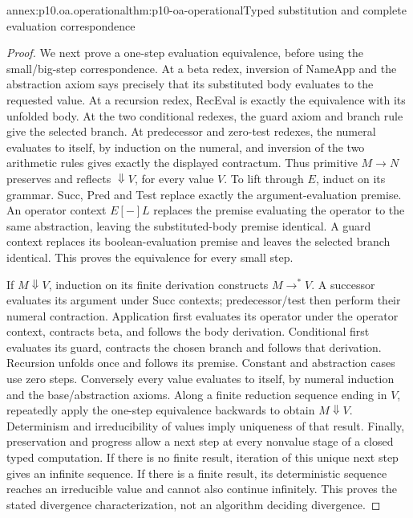 \begin{annexitem}{annex:p10.oa.operational}{thm:p10-oa-operational}{Typed substitution and complete evaluation correspondence}
\begin{proof}
We next prove a one-step evaluation equivalence, before using the
small/big-step correspondence. At a beta redex, inversion of NameApp
and the abstraction axiom says precisely that its substituted body
evaluates to the requested value. At a recursion redex, RecEval is
exactly the equivalence with its unfolded body. At the two conditional
redexes, the guard axiom and branch rule give the selected branch.
At predecessor and zero-test redexes, the numeral evaluates to itself,
by induction on the numeral, and inversion of the two arithmetic rules
gives exactly the displayed contractum. Thus primitive \(M\to N\)
preserves and reflects \(\Downarrow V\), for every value \(V\).
To lift through \(E\), induct on its grammar. Succ, Pred and Test
replace exactly the argument-evaluation premise. An operator context
\(E[-]L\) replaces the premise evaluating the operator to the same
abstraction, leaving the substituted-body premise identical. A guard
context replaces its boolean-evaluation premise and leaves the selected
branch identical. This proves the equivalence for every small step.

If \(M\Downarrow V\), induction on its finite derivation constructs
\(M\to^*V\). A successor evaluates its argument under Succ contexts;
predecessor/test then perform their numeral contraction. Application
first evaluates its operator under the operator context, contracts beta,
and follows the body derivation. Conditional first evaluates its guard,
contracts the chosen branch and follows that derivation. Recursion
unfolds once and follows its premise. Constant and abstraction cases
use zero steps. Conversely every value evaluates to itself, by numeral
induction and the base/abstraction axioms. Along a finite reduction
sequence ending in \(V\), repeatedly apply the one-step equivalence
backwards to obtain \(M\Downarrow V\).
Determinism and irreducibility of values imply uniqueness of that result.
Finally, preservation and progress allow a next step at every nonvalue
stage of a closed typed computation. If there is no finite result,
iteration of this unique next step gives an infinite sequence. If there
is a finite result, its deterministic sequence reaches an irreducible
value and cannot also continue infinitely. This proves the stated
divergence characterization, not an algorithm deciding divergence.
\end{proof}
\end{annexitem}


